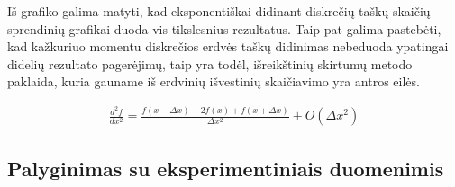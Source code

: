 Iš grafiko galima matyti, kad eksponentiškai didinant diskrečių taškų skaičių sprendinių grafikai duoda vis tikslesnius rezultatus. Taip pat galima pastebėti, kad kažkuriuo momentu diskrečios erdvės taškų didinimas nebeduoda ypatingai didelių rezultato pagerėjimų, taip yra todėl, išreikštinių skirtumų metodo paklaida, kuria gauname iš erdvinių išvestinių skaičiavimo yra antros eilės.

\begin{align}
    \frac{d^2f}{dx^2}=\frac{f(x - \Delta x) - 2f(x) + f(x + \Delta x)}{\Delta x^2} + O(\Delta x^2)
\end{align}

\subsection{Palyginimas su eksperimentiniais duomenimis}
